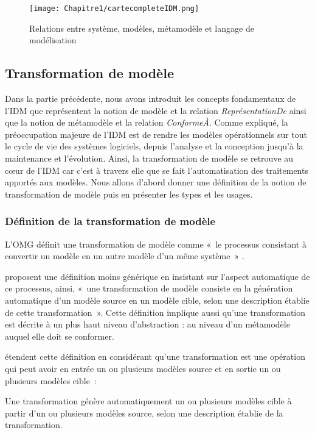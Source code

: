 \begin{figure}[!htbp]
 \begin{center}
  \texttt{[image: Chapitre1/cartecompleteIDM.png]}
 \end{center}
 \caption{Relations entre système, modèles, métamodèle et langage de modélisation \protect\cite{favre2006ingenierie}}
 \label{fig:carteFavre}
\end{figure}

\subsection{Transformation de modèle}
Dans la partie précédente, nous avons introduit les concepts fondamentaux de l'IDM que représentent la notion de modèle et la relation \textit{ReprésentationDe} ainsi que la notion de métamodèle et la relation \textit{ConformeÀ}. Comme expliqué, la préoccupation majeure de l'IDM est de rendre les modèles opérationnels sur tout le cycle de vie des systèmes logiciels, depuis l'analyse et la conception jusqu'à la maintenance et l'évolution. Ainsi, la transformation de modèle se retrouve au cœur de l'IDM car c'est à travers elle que se fait l'automatisation des traitements apportés aux modèles. Nous allons d'abord donner une définition de la notion de transformation de modèle puis en présenter les types et les usages.

\subsubsection{Définition de la transformation de modèle}
L'OMG définit une transformation de modèle comme «~le processus consistant à convertir un modèle en un autre modèle d'un même système~» \cite{omg2011meta}. 

\cite{kleppe2003mda} proposent une définition moins générique en insistant sur l'aspect automatique de ce processus, ainsi, «~une transformation de modèle consiste en la génération automatique d'un modèle source en un modèle cible, selon une description établie de cette transformation~». Cette définition implique aussi qu'une transformation est décrite à un plus haut niveau d'abstraction : au niveau d'un métamodèle auquel elle doit se conformer. 

\cite{mens2006taxonomy} étendent cette définition en considérant qu'une transformation est une opération qui peut avoir en entrée un ou plusieurs modèles source et en sortie un ou plusieurs modèles cible~: 

\begin{theorem}
Une transformation génère automatiquement un ou plusieurs modèles cible à partir d'un ou plusieurs modèles source, selon une description établie de la transformation. 
\end{theorem}

